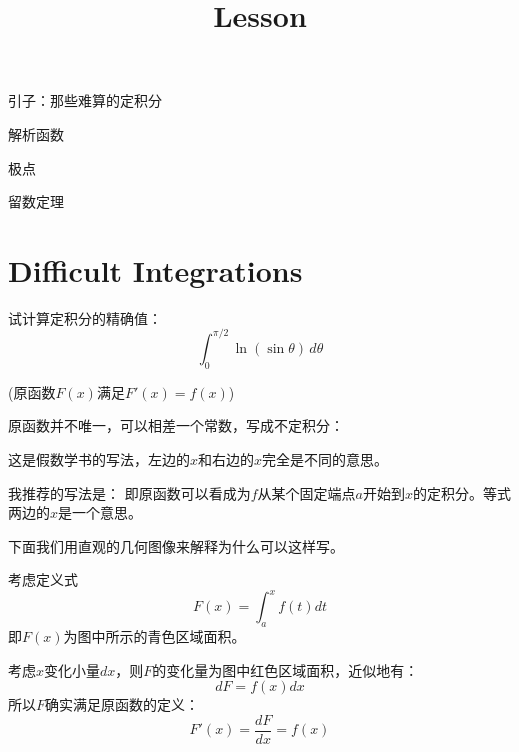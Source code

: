 \documentclass[CJK]{beamer}
\title{Lesson }
\author{}
\date{}
\begin{document}


\begin{frame}
\bch
\bitem
\item{引子：那些难算的定积分}
\item{解析函数}
\item{极点}  
\item{留数定理}  
\eitem
\ech
\end{frame}

\section{Difficult Integrations}

\begin{frame}
\bch
{}
试计算定积分的精确值：
$$\int_0^{\pi/2}\ln{\left(\sin\theta\right)}\,d\theta $$
\ech
\end{frame}

\begin{frame}
\bch
{}
(原函数$F(x)$满足$F'(x) = f(x)$)

\ech
\end{frame}

\begin{frame}
\bch
原函数并不唯一，可以相差一个常数，写成不定积分：

这是假数学书的写法，左边的$x$和右边的$x$完全是不同的意思。

我推荐的写法是：
即原函数可以看成为$f$从某个固定端点$a$开始到$x$的定积分。等式两边的$x$是一个意思。

下面我们用直观的几何图像来解释为什么可以这样写。

\ech
\end{frame}


\begin{frame}
\bch
考虑定义式$$ F(x) = \int_a^x f(t) dt$$
即$F(x)$为图中所示的青色区域面积。

考虑$x$变化小量$dx$，则$F$的变化量为图中红色区域面积，近似地有：
$$d F = f(x) dx$$
所以$F$确实满足原函数的定义：
$$F'(x) = \frac{dF}{dx} = f(x)$$

\emini
{}
\emini

\ech
\end{frame}
\end{document}
